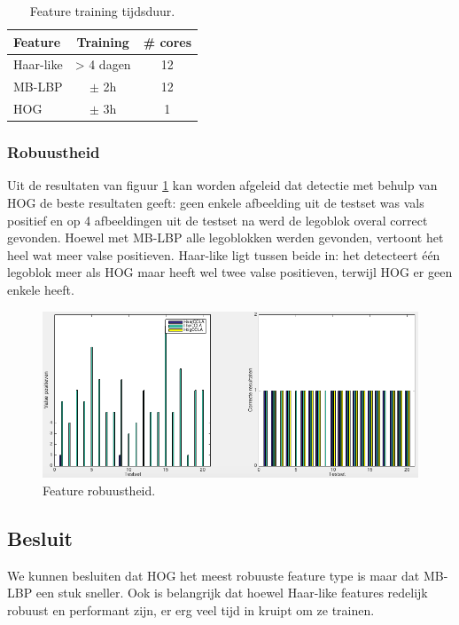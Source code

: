 \begin{table}
  \centering
  \begin{tabular}{@{}lcc@{}} \toprule
    Feature & Training & \# cores\\ \midrule
	Haar-like & > 4 dagen & 12 \\
	MB-LBP & $\pm$ 2h & 12\\
	HOG & $\pm$ 3h & 1\\ \bottomrule
  \end{tabular}
  \caption{Feature training tijdsduur.}
  \label{tab:feat_perf}
\end{table}

\subsubsection*{Robuustheid}

Uit de resultaten van figuur \ref{fig:featRobuust} kan worden afgeleid dat detectie met behulp van HOG de beste resultaten geeft: geen enkele afbeelding uit de testset was vals positief en op 4 afbeeldingen uit de testset na werd de legoblok overal correct gevonden. Hoewel met MB-LBP alle legoblokken werden gevonden, vertoont het heel wat meer valse positieven. Haar-like ligt tussen beide in: het detecteert \'e\'en legoblok meer als HOG maar heeft wel twee valse positieven, terwijl HOG er geen enkele heeft.

\begin{figure}
  \centering
  \includegraphics[width=\linewidth]{img/FeatRobust}
  \caption{Feature robuustheid.}
  \label{fig:featRobuust}
\end{figure}

\subsection{Besluit}
We kunnen besluiten dat HOG het meest robuuste feature type is maar dat MB-LBP een stuk sneller. Ook is belangrijk dat hoewel Haar-like features redelijk robuust en performant zijn, er erg veel tijd in kruipt om ze trainen.

